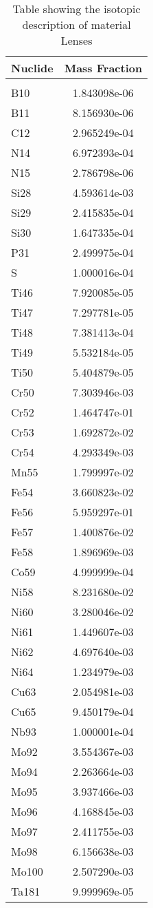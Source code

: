 \begin{centering}
\begin{table}[ht!]
\begin{tabular}{l | c}
\hline
Nuclide & Mass Fraction\\
\hline
\\
B10 & 1.843098e-06\\
B11 & 8.156930e-06\\
C12 & 2.965249e-04\\
N14 & 6.972393e-04\\
N15 & 2.786798e-06\\
Si28 & 4.593614e-03\\
Si29 & 2.415835e-04\\
Si30 & 1.647335e-04\\
P31 & 2.499975e-04\\
S & 1.000016e-04\\
Ti46 & 7.920085e-05\\
Ti47 & 7.297781e-05\\
Ti48 & 7.381413e-04\\
Ti49 & 5.532184e-05\\
Ti50 & 5.404879e-05\\
Cr50 & 7.303946e-03\\
Cr52 & 1.464747e-01\\
Cr53 & 1.692872e-02\\
Cr54 & 4.293349e-03\\
Mn55 & 1.799997e-02\\
Fe54 & 3.660823e-02\\
Fe56 & 5.959297e-01\\
Fe57 & 1.400876e-02\\
Fe58 & 1.896969e-03\\
Co59 & 4.999999e-04\\
Ni58 & 8.231680e-02\\
Ni60 & 3.280046e-02\\
Ni61 & 1.449607e-03\\
Ni62 & 4.697640e-03\\
Ni64 & 1.234979e-03\\
Cu63 & 2.054981e-03\\
Cu65 & 9.450179e-04\\
Nb93 & 1.000001e-04\\
Mo92 & 3.554367e-03\\
Mo94 & 2.263664e-03\\
Mo95 & 3.937466e-03\\
Mo96 & 4.168845e-03\\
Mo97 & 2.411755e-03\\
Mo98 & 6.156638e-03\\
Mo100 & 2.507290e-03\\
Ta181 & 9.999969e-05
\end{tabular}
\caption{Table showing the isotopic description of material Lenses}
\label{table:material_Lenses}
\end{table}\clearpage


\end{centering}

